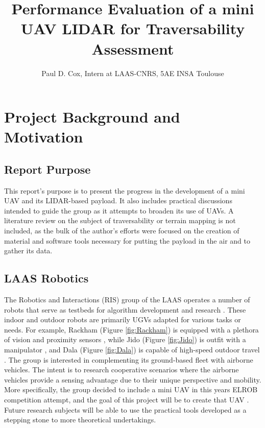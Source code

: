 \documentclass[a4paper,11pt]{report}
\title{Performance Evaluation of a mini UAV LIDAR for Traversability Assessment}
\author{Paul D. Cox, Intern at LAAS-CNRS, 5AE INSA Toulouse}
\begin{document}
\maketitle

\tableofcontents
\newpage

\chapter{Project Background and Motivation}

\section{Report Purpose}

This report's purpose is to present the progress in the development of a mini UAV and its LIDAR-based payload. It also includes practical discussions intended to guide the group as it attempts to broaden its use of UAVs. A literature review on the subject of traversability or terrain mapping is not included, as the bulk of the author's efforts were focused on the creation of material and software tools necessary for putting the payload in the air and to gather its data.

\section{LAAS Robotics}

The Robotics and Interactions (RIS) group of the LAAS operates a number of robots that serve as testbeds for algorithm development and research \cite{ugvs}. These indoor and outdoor robots are primarily UGVs adapted for various tasks or needs. For example, Rackham (Figure \ref{fig:Rackham}) is equipped with a plethora of vision and proximity sensors \cite{rackham}, while Jido (Figure \ref{fig:Jido}) is outfit with a manipulator \cite{jido}, and Dala (Figure \ref{fig:Dala}) is capable of high-speed outdoor travel \cite{dala}. The group is interested in complementing its ground-based fleet with airborne vehicles. The intent is to research cooperative scenarios where the airborne vehicles provide a sensing advantage due to their unique perspective and mobility. More specifically, the group decided to include a mini UAV in this years ELROB competition attempt, and the goal of this project will be to create that UAV \cite{this}. Future research subjects will be able to use the practical tools developed as a stepping stone to more theoretical undertakings.
\end{document}
